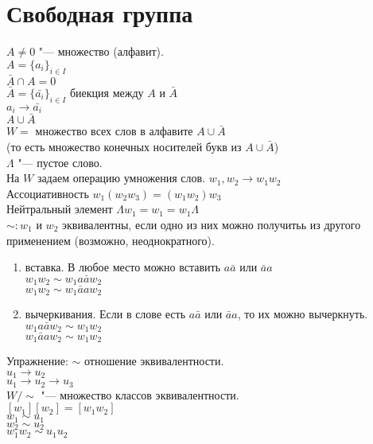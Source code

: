 ﻿\section{Свободная группа}
$A \ne 0$ "--- множество (алфавит).\\
$A = \{a_i\}_{i \in I}$\\
$\bar {A} \cap A = 0$\\
$\bar{A} = \{\bar{a_i}\}_{i \in I}$ биекция между $A$ и $\bar{A}$\\
$a_i \to \bar{a_i}$\\
$A \cup \bar{A}$\\
$W = $ множество всех слов в алфавите $A \cup \bar{A}$\\
(то есть множество конечных носителей букв из $A \cup \bar{A}$)\\
$\Lambda$ "--- пустое слово. \\
На $W$ задаем операцию умножения слов. 
$w_1, w_2 \to w_1w_2$\\

Ассоциативность $w_1(w_2w_3) = (w_1w_2)w_3$\\
Нейтральный элемент $\Lambda w_1 = w_1 = w_1 \Lambda$\\

$\sim \colon w_1$ и $w_2$ эквивалентны, если одно из них можно получитьь из другого
применением (возможно, неоднократного).
\begin{enumerate}
\item вставка. В любое место можно вставить $a\bar{a}$ или $\bar{a}a$\\
$w_1w_2 \sim w_1a\bar{a}w_2$\\
$w_1w_2 \sim w_1\bar{a}aw_2$\\
\item вычеркивания. Если в слове есть $a \bar{a}$ или $\bar{a}a$, то их можно вычеркнуть. 
$w_1a\bar{a}w_2 \sim w_1w_2$\\
$w_1\bar{a}aw_2 \sim w_1w_2$\\
\end{enumerate}

Упражнение: $\sim$ отношение эквивалентности.\\
$u_1 \to u_2$\\
$u_1 \to u_2 \to u_3$\\

$W/\sim$ "--- множество классов эквивалентности.\\
$[w_1][w_2] = [w_1w_2]$ \\
$w_1 \sim u_1$\\
$w_2 \sim u_2$\\
$w_1w_2 \sim u_1u_2$\\

